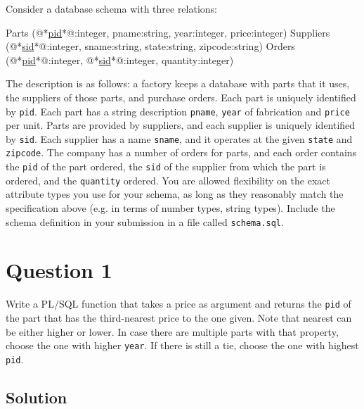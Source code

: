 
Consider a database schema with three relations:\\

\begin{terminal}
Parts (@*\underline{pid}*@:integer, pname:string, year:integer, price:integer)
Suppliers (@*\underline{sid}*@:integer, sname:string, state:string, zipcode:string)
Orders (@*\underline{pid}*@:integer, @*\underline{sid}*@:integer, quantity:integer)
\end{terminal}

The description is as follows: a factory keeps a database with parts that it uses, the suppliers of those parts, and  purchase orders.
Each part is uniquely identified by \texttt{pid}.
Each part has a string description \texttt{pname}, \texttt{year} of fabrication and \texttt{price} per unit.
Parts are provided by suppliers, and each supplier is uniquely identified by \texttt{sid}.
Each supplier has a name \texttt{sname}, and it operates at the given \texttt{state} and \texttt{zipcode}.
The company has a number of orders for parts, and each order contains the \texttt{pid} of the part ordered, the \texttt{sid} of the supplier from which the part is ordered, and the \texttt{quantity} ordered.
You are allowed flexibility on the exact attribute types you use for your schema, as long as they reasonably match the specification above (e.g. in terms of number types, string types).
Include the schema definition in your submission in a file called \texttt{schema.sql}.

\section*{Question 1}

Write a PL/SQL function that takes a price as argument and  returns the \texttt{pid} of the part that has the third-nearest price to the one given.
Note that nearest can be either higher or lower.
In case there are multiple parts with that property, choose the one with higher \texttt{year}.
If there is still a tie, choose the one with highest \texttt{pid}.

\subsection*{Solution}

\lstset{language=SQL}

